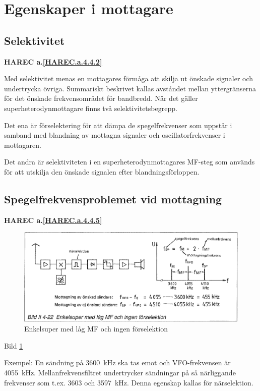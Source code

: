 \section{Egenskaper i mottagare}

\subsection{Selektivitet}
\textbf{HAREC a.\ref{HAREC.a.4.4.2}\label{myHAREC.a.4.4.2}}

Med selektivitet menas en mottagares förmåga att skilja ut önskade
signaler och undertrycka övriga. Summariskt beskrivet kallas avståndet
mellan yttergränserna för det önskade frekvensområdet för
bandbredd. När det gäller superheterodynmottagare finns två
selektivitetsbegrepp.

Det ena är förselektering för att dämpa de spegelfrekvenser som
uppstår i samband med blandning av mottagna signaler och
oscillatorfrekvenser i mottagaren.

Det andra är selektiviteten i en superheterodynmottagares MF-steg som används
för att utskilja den önskade signalen efter blandningsförloppen.

\subsection{Spegelfrekvensproblemet vid mottagning}
\textbf{HAREC a.\ref{HAREC.a.4.4.5}\label{myHAREC.a.4.4.5}}

\begin{figure}
  \includegraphics[width=\textwidth]{images/bild_2_4-22}
  \caption{Enkelsuper med låg MF och ingen förselektion}
  \label{fig:bildII4-22}
\end{figure}

Bild \ref{fig:bildII4-22}

Exempel: En sändning på 3600~kHz ska tas emot och VFO-frekvensen är
4055~kHz. Mellanfrekvensfiltret undertrycker sändningar på så
närliggande frekvenser som t.ex. 3603 och 3597~kHz. Denna egenskap
kallas för närselektion.

